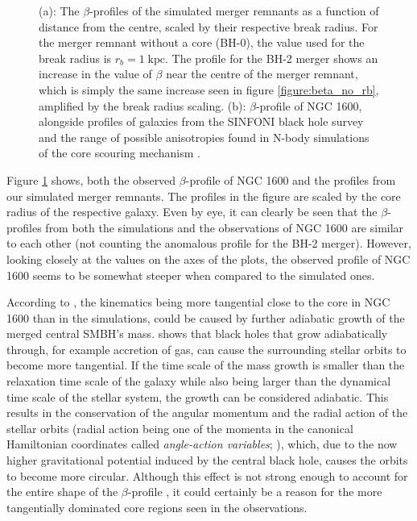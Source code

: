 \documentclass[english, twoside]{HYgradu}
\begin{document}
\begin{figure}
	\caption{(a): The $\beta$-profiles of the simulated merger remnants as a function of distance from the centre, scaled by their respective break radius. For the merger remnant without a core (BH-0), the value used for the break radius is $r_b = 1 \; \mathrm{kpc}$. The profile for the BH-2 merger shows an increase in the value of $\beta$ near the centre of the merger remnant, which is simply the same increase seen in figure \ref{figure:beta_no_rb}, amplified by the break radius scaling. (b): $\beta$-profile of NGC 1600, alongside profiles of galaxies from the SINFONI black hole survey \citep{Saglia2016} and the range of possible anisotropies found in N-body simulations of the core scouring mechanism \citep{Thomas2016}.}
	\label{figure:beta_NGC1600_Simul}
\end{figure}

Figure \ref{figure:beta_NGC1600_Simul} shows, both the observed $\beta$-profile of NGC 1600 and the profiles from our simulated merger remnants. The profiles in the figure are scaled by the core radius of the respective galaxy. Even by eye, it can clearly be seen that the $\beta$-profiles from both the simulations and the observations of NGC 1600 are similar to each other (not counting the anomalous profile for the BH-2 merger). However, looking closely at the values on the axes of the plots, the observed profile of NGC 1600 seems to be somewhat steeper when compared to  the simulated ones.


According to \cite{Rantala2018}, the kinematics being more tangential close to the core in NGC 1600 than in the simulations, could be caused by further adiabatic growth of the merged central SMBH's mass. \cite{Young1980} shows that black holes that grow adiabatically through, for example accretion of gas, can cause the surrounding stellar orbits to become more tangential. If the time scale of the mass growth is smaller than the relaxation time scale of the galaxy while also being larger than the dynamical time scale of the stellar system, the growth can be considered adiabatic. This results in the conservation of the angular momentum and the radial action of the stellar orbits (radial action being one of the momenta in the canonical Hamiltonian coordinates called \textit{angle-action variables}; \citealt{BinneyTremaine}), which, due to the now higher gravitational potential induced by the central black hole, causes the orbits to become more circular. Although this effect is not strong enough to account for the entire shape of the $\beta$-profile \citep{Thomas2016}, it could certainly be a reason for the more tangentially dominated core regions seen in the observations.
\end{document}
